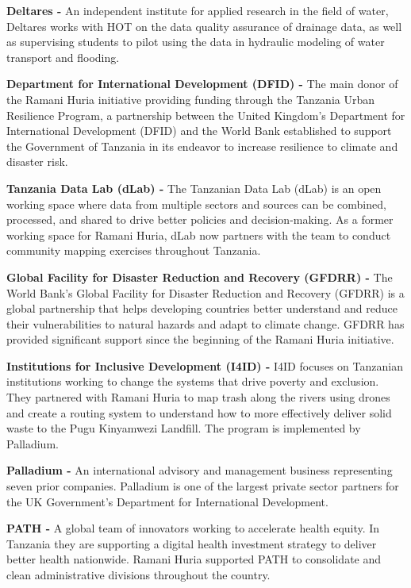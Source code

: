 \documentclass[a4paper,12pt,twoside]{article}
\begin{document}
\begin{multicols}
\textbf{Deltares -} An independent institute for applied research in the field of water, Deltares works with HOT on the data quality assurance of drainage data, as well as supervising students to pilot using the data in hydraulic modeling of water transport and flooding. 

\textbf{Department for International Development (DFID) -} The main donor of the Ramani Huria initiative providing funding through the Tanzania Urban Resilience Program, a partnership between the United Kingdom’s Department for International Development (DFID) and the World Bank established to support the Government of Tanzania in its endeavor to increase resilience to climate and disaster risk. 

\textbf{Tanzania Data Lab (dLab) -} The Tanzanian Data Lab (dLab) is an open working space where data from multiple sectors and sources can be combined, processed, and shared to drive better policies and decision-making. As a former working space for Ramani Huria, dLab now partners with the team to conduct community mapping exercises throughout Tanzania. 

\textbf{Global Facility for Disaster Reduction and Recovery (GFDRR) -} The World Bank’s Global Facility for Disaster Reduction and Recovery (GFDRR) is a global partnership that helps developing countries better understand and reduce their vulnerabilities to natural hazards and adapt to climate change. GFDRR has provided significant support since the beginning of the Ramani Huria initiative.

\textbf{Institutions for Inclusive Development  (I4ID) -} I4ID focuses on Tanzanian institutions working to change the systems that drive poverty and exclusion. They partnered with Ramani Huria to map trash along the rivers using drones and create a routing system to understand how to more effectively deliver solid waste to the Pugu Kinyamwezi Landfill. The program is implemented by Palladium. 

\textbf{Palladium -}
An international advisory and management business representing seven prior companies. Palladium is one of the largest private sector partners for the UK Government’s Department for International Development.

\textbf{PATH -}
A global team of innovators working to accelerate health equity. In Tanzania they are supporting a digital health investment strategy to deliver better health nationwide. Ramani Huria supported PATH to consolidate and clean administrative divisions throughout the country. 



\end{multicols}
\end{document}
